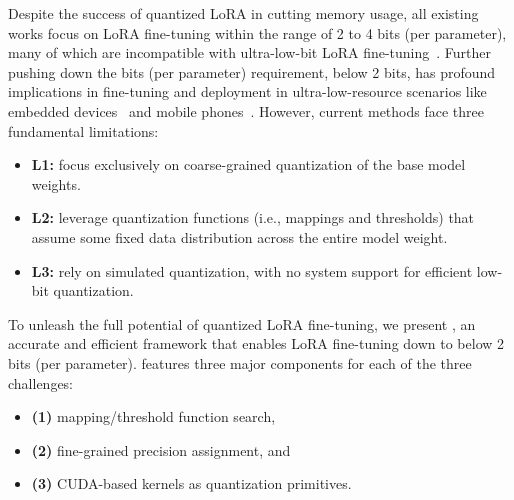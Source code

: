 Despite the success of quantized LoRA in cutting memory usage, all existing works focus on LoRA fine-tuning within the range of 2 to 4 bits (per parameter), many of which are incompatible with ultra-low-bit LoRA fine-tuning~\cite{wang2024lora,meng2024pissa,dettmers2024qlora}. Further pushing down the bits (per parameter) requirement, \eg below 2 bits, has profound implications in fine-tuning and deployment in ultra-low-resource scenarios like embedded devices~\cite{shen2023agilequantactivationguidedquantizationfaster, chai2025flexquantelasticquantizationframework} and mobile phones~\cite{wang2025bitstackanysizecompressionlarge, tan2024mobilequantmobilefriendlyquantizationondevice}. However, current methods face three fundamental limitations:
\begin{itemize}
    \item \textbf{L1:} focus exclusively on coarse-grained quantization of the base model weights.
    \item \textbf{L2:} leverage quantization functions (i.e., mappings and thresholds) that assume some fixed data distribution across the entire model weight.
    \item \textbf{L3:} rely on simulated quantization, with no system support for efficient low-bit quantization. 
\end{itemize}

To unleash the full potential of quantized LoRA fine-tuning, we present \FWName{}, an accurate and efficient framework that enables 
LoRA fine-tuning down to below 2 bits (per parameter). 
\FWName{} features three major components for each of the three challenges:
\begin{itemize}
 \item \textbf{(1)} mapping/threshold function search,
 \item \textbf{(2)} fine-grained precision assignment, and 
 \item \textbf{(3)} CUDA-based kernels as quantization primitives.
\end{itemize}


